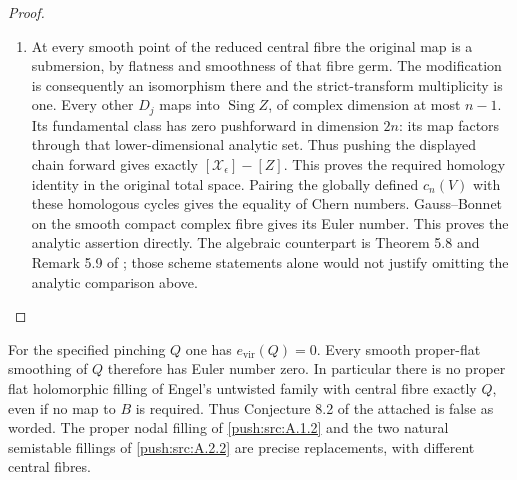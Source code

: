 \begin{proof}
\begin{enumerate}[label=\arabic*.,leftmargin=*]
\item At every smooth point of the reduced central fibre the original
map is a submersion, by flatness and smoothness of that fibre germ.
The modification is consequently an isomorphism there and the
strict-transform multiplicity is one. Every other $D_j$ maps into
$\operatorname{Sing}Z$, of complex dimension at most $n-1$.
Its fundamental class has zero pushforward in dimension $2n$:
its map factors through that lower-dimensional analytic set.
Thus pushing the displayed chain forward gives exactly
$[\mathcal X_\epsilon]-[Z]$. This proves the required homology
identity in the original total space. Pairing the globally defined
$c_n(V)$ with these homologous cycles gives the equality of
Chern numbers. Gauss--Bonnet on the smooth compact complex
fibre gives its Euler number. This proves the analytic assertion
directly. The algebraic counterpart is Theorem 5.8 and
Remark 5.9 of \cite{FG10}; those scheme statements alone would
not justify omitting the analytic comparison above.
\end{enumerate}
\end{proof}

\begin{theorem}\label{push:src:A.3.2}\label{push:A32}

For the specified pinching $Q$ one has $e_{\mathrm{vir}}(Q)=0$.
Every smooth proper-flat smoothing of $Q$ therefore has Euler
number zero. In particular there is no proper flat holomorphic
filling of Engel's untwisted family with central fibre exactly
$Q$, even if no map to $B$ is required. Thus Conjecture 8.2
of the attached \cite{Engel2026} is false as worded. The proper nodal
filling of \ref{push:src:A.1.2} and the two natural semistable fillings of
\ref{push:src:A.2.2} are precise replacements, with different central fibres.
\end{theorem}


